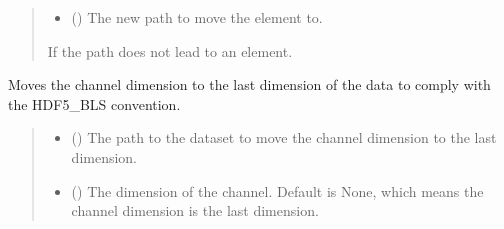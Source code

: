 \documentclass[letterpaper,10pt,english]{sphinxmanual}
\begin{document}
\begin{fulllineitems}
\begin{fulllineitems}
\begin{quote}
\begin{description}
\begin{itemize}
\item {} 
\sphinxAtStartPar
{} () \textendash{} The new path to move the element to.

\end{itemize}

\sphinxAtStartPar
{\hyperref[\detokenize{source/_autosummary/HDF5_BLS.errors:HDF5_BLS.errors.WrapperError_StructureError}]{}} \textendash{} If the path does not lead to an element.

\end{description}\end{quote}

\end{fulllineitems}


\begin{fulllineitems}
\label{\detokenize{source/_autosummary/HDF5_BLS.Wrapper:HDF5_BLS.Wrapper.move_channel_dimension_to_last}}
\pysigstartsignatures
\pysiglinewithargsret
{}
{\sphinxparamcomma {}}
{}
\pysigstopsignatures
\sphinxAtStartPar
Moves the channel dimension to the last dimension of the data to comply with the HDF5\_BLS convention.
\begin{quote}\begin{description}
\begin{itemize}
\item {} 
\sphinxAtStartPar
{} () \textendash{} The path to the dataset to move the channel dimension to the last dimension.

\item {} 
\sphinxAtStartPar
{} (\sphinxstyleliteralemphasis{\sphinxupquote{, }}) \textendash{} The dimension of the channel. Default is None, which means the channel dimension is the last dimension.


\end{itemize}
\end{description}
\end{quote}
\end{fulllineitems}
\end{fulllineitems}
\end{document}
